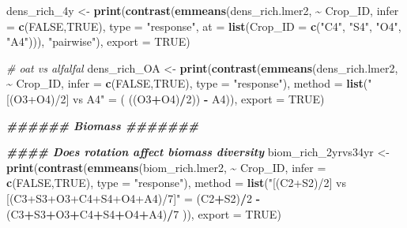 \documentclass[
]{article}
\newenvironment{Shaded}{\begin{snugshade}}{\end{snugshade}}
\newcommand{\AttributeTok}[1]{\textcolor[rgb]{0.13,0.29,0.53}{#1}}
\newcommand{\CommentTok}[1]{\textcolor[rgb]{0.56,0.35,0.01}{\textit{#1}}}
\newcommand{\ConstantTok}[1]{\textcolor[rgb]{0.56,0.35,0.01}{#1}}
\newcommand{\DecValTok}[1]{\textcolor[rgb]{0.00,0.00,0.81}{#1}}
\newcommand{\DocumentationTok}[1]{\textcolor[rgb]{0.56,0.35,0.01}{\textbf{\textit{#1}}}}
\newcommand{\FunctionTok}[1]{\textcolor[rgb]{0.13,0.29,0.53}{\textbf{#1}}}
\newcommand{\NormalTok}[1]{#1}
\newcommand{\OtherTok}[1]{\textcolor[rgb]{0.56,0.35,0.01}{#1}}
\newcommand{\SpecialCharTok}[1]{\textcolor[rgb]{0.81,0.36,0.00}{\textbf{#1}}}
\newcommand{\StringTok}[1]{\textcolor[rgb]{0.31,0.60,0.02}{#1}}
\begin{document}
\begin{Shaded}
\begin{Highlighting}[]
\NormalTok{dens\_rich\_4y }\OtherTok{\textless{}{-}} \FunctionTok{print}\NormalTok{(}\FunctionTok{contrast}\NormalTok{(}\FunctionTok{emmeans}\NormalTok{(dens\_rich.lmer2, }\SpecialCharTok{\textasciitilde{}}\NormalTok{ Crop\_ID,}
                                       \AttributeTok{infer =} \FunctionTok{c}\NormalTok{(}\ConstantTok{FALSE}\NormalTok{,}\ConstantTok{TRUE}\NormalTok{), }
                                       \AttributeTok{type =} \StringTok{"response"}\NormalTok{,}
                                       \AttributeTok{at =} \FunctionTok{list}\NormalTok{(}\AttributeTok{Crop\_ID =} \FunctionTok{c}\NormalTok{(}\StringTok{"C4"}\NormalTok{, }\StringTok{"S4"}\NormalTok{, }\StringTok{"O4"}\NormalTok{, }\StringTok{"A4"}\NormalTok{))), }
                               \StringTok{"pairwise"}\NormalTok{), }\AttributeTok{export =} \ConstantTok{TRUE}\NormalTok{)}

\CommentTok{\# oat vs alfalfal}
\NormalTok{dens\_rich\_OA }\OtherTok{\textless{}{-}} \FunctionTok{print}\NormalTok{(}\FunctionTok{contrast}\NormalTok{(}\FunctionTok{emmeans}\NormalTok{(dens\_rich.lmer2, }\SpecialCharTok{\textasciitilde{}}\NormalTok{ Crop\_ID,}
                                       \AttributeTok{infer =} \FunctionTok{c}\NormalTok{(}\ConstantTok{FALSE}\NormalTok{,}\ConstantTok{TRUE}\NormalTok{),}
                                       \AttributeTok{type =} \StringTok{"response"}\NormalTok{),}
                               \AttributeTok{method =} \FunctionTok{list}\NormalTok{(}\StringTok{"[(O3+O4)/2] vs A4"} \OtherTok{=}\NormalTok{ ( ((O3}\SpecialCharTok{+}\NormalTok{O4)}\SpecialCharTok{/}\DecValTok{2}\NormalTok{)) }\SpecialCharTok{{-}}\NormalTok{ A4)), }
                      \AttributeTok{export =} \ConstantTok{TRUE}\NormalTok{)}

\DocumentationTok{\#\#\#\#\#\# Biomass \#\#\#\#\#\#\#}

\DocumentationTok{\#\#\#\# Does rotation affect biomass diversity}
\NormalTok{biom\_rich\_2yrvs34yr }\OtherTok{\textless{}{-}} \FunctionTok{print}\NormalTok{(}\FunctionTok{contrast}\NormalTok{(}\FunctionTok{emmeans}\NormalTok{(biom\_rich.lmer2, }\SpecialCharTok{\textasciitilde{}}\NormalTok{ Crop\_ID, }
                                              \AttributeTok{infer =} \FunctionTok{c}\NormalTok{(}\ConstantTok{FALSE}\NormalTok{,}\ConstantTok{TRUE}\NormalTok{), }
                                              \AttributeTok{type =} \StringTok{"response"}\NormalTok{),}
                                      \AttributeTok{method =} \FunctionTok{list}\NormalTok{(}\StringTok{"[(C2+S2)/2] vs [(C3+S3+O3+C4+S4+O4+A4)/7]"} \OtherTok{=}
\NormalTok{                                                      (C2}\SpecialCharTok{+}\NormalTok{S2)}\SpecialCharTok{/}\DecValTok{2} \SpecialCharTok{{-}}\NormalTok{ (C3}\SpecialCharTok{+}\NormalTok{S3}\SpecialCharTok{+}\NormalTok{O3}\SpecialCharTok{+}\NormalTok{C4}\SpecialCharTok{+}\NormalTok{S4}\SpecialCharTok{+}\NormalTok{O4}\SpecialCharTok{+}\NormalTok{A4)}\SpecialCharTok{/}\DecValTok{7}\NormalTok{ )), }
                             \AttributeTok{export =} \ConstantTok{TRUE}\NormalTok{)}



\end{Highlighting}
\end{Shaded}
\end{document}
